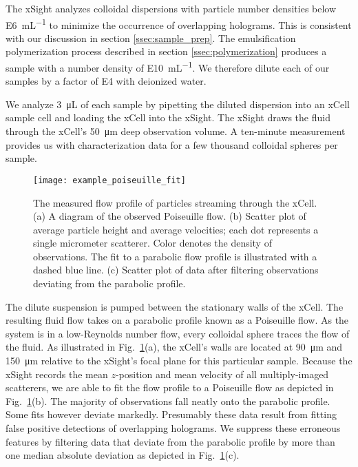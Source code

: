 The xSight analyzes colloidal dispersions with particle number densities below 
\SI{E6}{\milli\liter^{-1}} to minimize the occurrence of overlapping holograms.
This is consistent with our discussion in section \ref{ssec:sample_prep}.
The emulsification polymerization process described in section \ref{ssec:polymerization}
produces a sample with a number density of \SI{E10}{\milli\liter^{-1}}.
We therefore dilute each of our samples by a factor of \SI{E4}{} with
deionized water.

We analyze \SI{3}{\micro\liter} of each sample by pipetting the diluted dispersion into an
xCell sample cell and loading the xCell into the xSight. The xSight draws the fluid through
the xCell's \SI{50}{\um} deep observation volume. A ten-minute measurement provides us with
characterization data for a few thousand colloidal spheres per sample.

\begin{figure}
    \centering
    \texttt{[image: example\_poiseuille\_fit]}
    \caption{The measured flow profile of particles streaming through the xCell.
      (a)  A diagram of the observed Poiseuille flow.\protect\footnotemark 
      (b) Scatter plot of average particle height and average velocities; each
      dot represents a single micrometer scatterer. Color denotes the density of
      observations. The fit to a parabolic flow profile is illustrated with a dashed
      blue line. (c) Scatter plot of data after filtering observations deviating
      from the parabolic profile.}
    \label{fig:flow_prof}
\end{figure}

The dilute suspension is pumped between the stationary walls of the xCell.
The resulting fluid flow takes on a parabolic profile known as a Poiseuille flow.
As the system is in a low-Reynolds number flow, every colloidal sphere traces
the flow of the fluid.
As illustrated in Fig.~\ref{fig:flow_prof}(a), the xCell's walls are located
at \SI{90}{\um} and \SI{150}{\um} relative to the xSight's focal plane for this
particular sample.
Because the xSight records the mean $z$-position and mean 
velocity of all multiply-imaged scatterers, we are able to fit the flow
profile to a Poiseuille flow as depicted in Fig.~\ref{fig:flow_prof}(b).
The majority of observations fall neatly onto the parabolic profile. 
Some fits however deviate markedly. Presumably these data result from fitting
false positive detections of overlapping holograms.
We suppress these erroneous features by filtering data that deviate from
the parabolic profile by more than one median absolute deviation
as depicted in Fig.~\ref{fig:flow_prof}(c).

